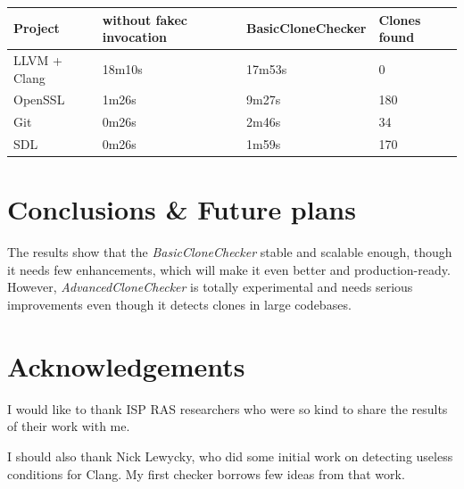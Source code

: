 \documentclass[a0,portrait]{a0poster}
\begin{document}
\begin{multicols}{2}
\begin{center}\vspace{1cm}
\begin{tabular}{l l l l}
\toprule
\textbf{Project} & \textbf{without fakec invocation} &
\textbf{BasicCloneChecker} & \textbf{Clones found} \\
\midrule
LLVM + Clang & 18m10s & 17m53s & 0 \\
OpenSSL & 1m26s & 9m27s & 180 \\
Git & 0m26s & 2m46s & 34 \\
SDL & 0m26s & 1m59s & 170 \\
\bottomrule
\end{tabular}
\end{center}\vspace{1cm}


\section*{Conclusions \& Future plans}

The results show that the \textit{BasicCloneChecker} stable and scalable enough, though
it needs few enhancements, which will make it even better and production-ready. However,
\textit{AdvancedCloneChecker} is totally experimental and needs serious improvements
even though it detects clones in large codebases.


\nocite{*}



\section*{Acknowledgements}

I would like to thank ISP RAS researchers who were so kind to share the results of their
work with me.

I should also thank Nick Lewycky, who did some initial work on detecting useless
conditions for Clang. My first checker borrows few ideas from that work.


\end{multicols}
\end{document}

